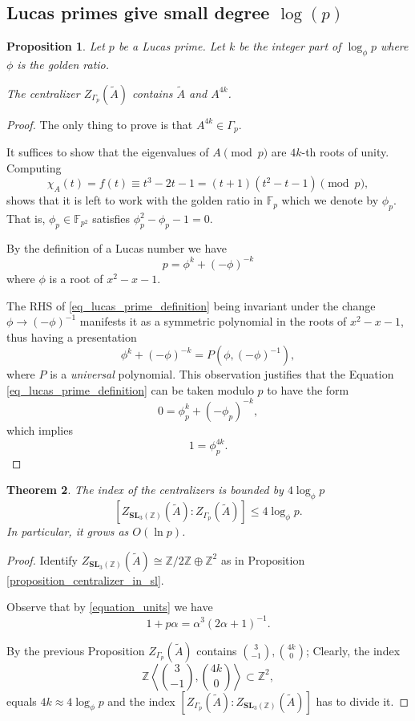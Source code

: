 \documentclass[a4paper]{article}
\newtheorem{Thm}{Theorem}[section]
\newtheorem{Prop}[Thm]{Proposition}
\newcommand{\SL}{\mathbf{SL}_3(\mathbb{Z})}        %
\newcommand{\SLp}{\Gamma_p}        %
\newcommand{\phip}{\phi_p}        %
\begin{document}
\subsection{Lucas primes give small degree $\log(p)$}

\begin{Prop}
Let $p$ be a Lucas prime.
Let $k$ be the integer part of $\log_{\phi} p$ where $\phi$ is the golden ratio.

The centralizer $Z_{\SLp}(\tilde A)$ contains $\tilde A$ and $A^{4k}$.
\end{Prop}
\begin{proof}
The only thing to prove is that 
$A^{4k}  \in \SLp$.

It suffices to show that the eigenvalues of $A \pmod p$ are $4k$-th roots of unity.
Computing
\[
\chi_{A}(t) = f(t) \equiv t^3 - 2 t - 1 = (t + 1) (t^2 - t - 1) \pmod p
,\] 
shows that it is left to work with the golden ratio in $\mathbb F_p$ which we denote by $\phip$.
That is, $\phip \in \mathbb F_{p^2}$ satisfies $\phip^2 - \phip - 1 = 0$.


By the definition of a Lucas number we have 
\begin{equation}
	\label{eq_lucas_prime_definition}
p = \phi^k + (-\phi)^{-k} 
\end{equation}
where $\phi$ is a root of $x^2 - x - 1$.

The RHS of \eqref{eq_lucas_prime_definition} being invariant under the change $\phi \to (-\phi)^{-1}$ manifests it as a symmetric polynomial in the roots of $x^2 - x - 1$, thus having a presentation
\[
\phi^k + (-\phi)^{-k} = P( \phi, (-\phi)^{-1})
,\] 
where $P$ is a \emph{universal} polynomial.
This observation justifies that the Equation \eqref{eq_lucas_prime_definition} can be taken modulo $p$ to have the form
\[
0 = \phip^k + (-\phip)^{-k} 
,\] 
which implies 
\[
1 = \phip^{4k} 
.\] 
\end{proof}

\begin{Thm}
	The index of the centralizers is bounded by $4 \log_{\phi} p$
\[
	[Z_{\SL}(\tilde A) : Z_{\SLp}(\tilde A)] \le 4 \log_{\phi} p
.\] 
In particular, it grows as $O(\ln p)$.
\end{Thm}
\begin{proof}
Identify $Z_{\SL}(\tilde A) \cong \mathbb{Z}/2\mathbb{Z} \oplus \mathbb{Z}^2$ as in Proposition \ref{proposition_centralizer_in_sl}.

Observe that by \eqref{equation_units} we have
\[
1 + p \alpha = \alpha^3 (2 \alpha + 1)^{-1} 
.\] 

By the previous Proposition 
$Z_{\SLp}(\tilde A)$ contains $\binom{3}{-1}, \binom{4k}{0}$;
Clearly, the index
\[
\mathbb{Z} \left< \binom{3}{-1}, \binom{4k}{0}\right> \subset \mathbb{Z}^2
,\] 
equals $4k \approx 4 \log_{\phi} p$ and the index 
$ [Z_{\SLp}(\tilde A) : Z_{\SL}(\tilde A)]$
has to divide it.
\end{proof}
\end{document}

